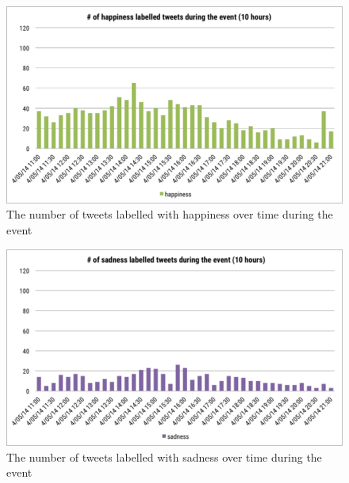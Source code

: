 \begin{figure}[htb!] 
\centering    
\includegraphics[width=1.0\textwidth]{HappinessInstanceEvent}
\caption{The number of tweets labelled with happiness over time during the event}
\label{fig:happinessInstanceEvent}
\end{figure}

\begin{figure}[htb!] 
\centering    
\includegraphics[width=1.0\textwidth]{SadnessInstanceEvent}
\caption{The number of tweets labelled with sadness over time during the event}
\label{fig:sadnessInstanceEvent}
\end{figure}

